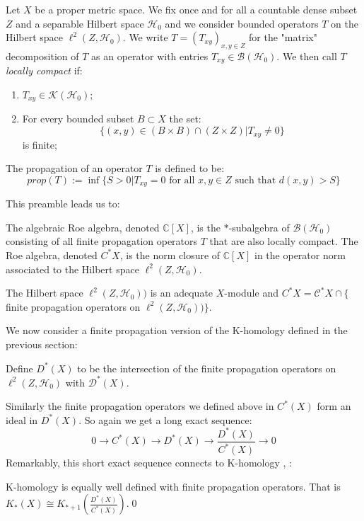 Let $X$ be a proper metric space. We fix once and for all a countable dense subset $Z$ and a separable Hilbert space $\mathcal{H}_{0}$ and we consider bounded operators $T$ on the Hilbert space $\ell^{2}(Z,\mathcal{H}_{0})$. We write $T=(T_{xy})_{x,y \in Z}$ for the "matrix" decomposition of $T$ as an operator with entries $T_{xy} \in \mathcal{B}(\mathcal{H}_{0})$. We then call $T$ \textit{locally compact} if:
\begin{enumerate}
\item $T_{xy}\in \mathcal{K}(\mathcal{H}_{0})$;
\item For every bounded subset $B \subset X$ the set:
\begin{equation*}
\lbrace (x,y)\in (B \times B) \cap (Z \times Z) | T_{xy}\not= 0 \rbrace 
\end{equation*}
is finite;
\end{enumerate} 
The propagation of an operator $T$ is defined to be:
\begin{equation*}
prop(T):= \inf \lbrace S>0 | T_{xy}=0 \mbox{ for all } x,y \in Z \mbox{ such that } d(x,y)>S \rbrace
\end{equation*}

This preamble leads us to:

\begin{definition}
The algebraic Roe algebra, denoted $\mathbb{C}[X]$, is the $*$-subalgebra of $\mathcal{B}(\mathcal{H}_{0})$ consisting of all finite propagation operators $T$ that are also locally compact. The Roe algebra, denoted $C^{*}X$, is the norm closure of $\mathbb{C}[X]$ in the operator norm associated to the Hilbert space $\ell^{2}(Z,\mathcal{H}_{0})$.
\end{definition}

\begin{remark}
The Hilbert space $\ell^{2}(Z,\mathcal{H}_{0}))$ is an adequate $X$-module \cite{explg1} and $C^{*}X = \mathcal{C}^{*}X \cap \lbrace$finite propagation operators on $\ell^{2}(Z,\mathcal{H}_{0}))\rbrace$.
\end{remark}

We now consider a finite propagation version of the K-homology defined in the previous section:

\begin{definition}
Define $D^{*}(X)$ to be the intersection of the finite propagation operators on $\ell^{2}(Z,\mathcal{H}_{0})$ with $\mathcal{D}^{*}(X)$. 
\end{definition}
Similarly the finite propagation operators we defined above in $C^{*}(X)$  form an ideal in $D^{*}(X)$. So again we get a long exact sequence:
\begin{equation*}
0 \rightarrow C^{*}(X) \rightarrow D^{*}(X) \rightarrow \frac{D^{*}(X)}{C^{*}(X)}\rightarrow 0
\end{equation*} 
Remarkably, this short exact sequence connects to K-homology \cite[Corollary 5.9]{MR1399087}, \cite[Lemma 12.3.2]{MR1817560}:
\begin{theorem}\label{Thm:Khom}
K-homology is equally well defined with finite propagation operators. That is $K_{*}(X)\cong K_{*+1}( \frac{D^{*}(X)}{C^{*}(X)})$.\qed
\end{theorem}

